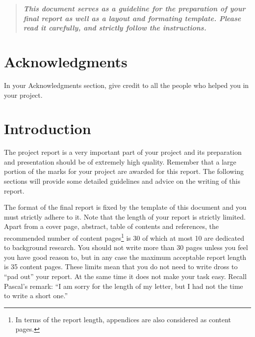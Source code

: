 \documentclass[]{final_report}
\begin{document}
\maketitle


\begin{abstract}

\textbf{\textsl{This document serves as a guideline for the preparation of your final report as well as a layout and formating template. Please read it carefully, and strictly follow the instructions.}}


\end{abstract}
\newpage



\chapter*{Acknowledgments}

In your Acknowledgments section, give credit to all the people who helped you in your project.


\chapter{Introduction}


The project report is a very important part of your project and its preparation and presentation should be of extremely high quality. Remember that a large portion of the marks for your project are awarded for this report. The following sections will provide some detailed guidelines and advice on the writing of this report.

The format of the final report is fixed by the template of this document and you must  strictly adhere to it.  Note that the length of your report is strictly limited. Apart from a cover page, abstract, table of contents and references, the recommended number of content pages\footnote{In terms of the report length, appendices are also considered as content pages.} is 30 of which at most 10 are dedicated to background research. You should not write more than 30 pages unless you feel you have good reason to, but in any case the maximum acceptable report length is 35 content pages. These limits mean that you do not need to write dross to ``pad out'' your report. At the same time it does not make your task easy. Recall Pascal's remark: ``I am sorry for the length of my letter, but I had not the time to write a short one.''
\end{document}
